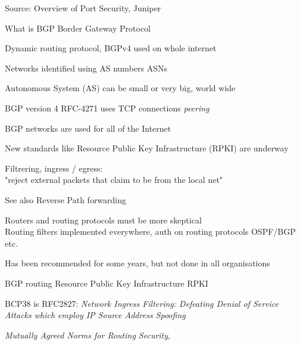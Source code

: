 \documentclass[Screen16to9,17pt]{foils}
\begin{document}
Source: Overview of Port Security, Juniper\\ {\small{}}





\begin{list1}
\item What is BGP Border Gateway Protocol
\item Dynamic routing protocol, BGPv4 used on whole internet
\item Networks identified using AS numbers ASNs
\item Autonomous System (AS) can be small or very big, world wide
\item BGP version 4 RFC-4271 uses TCP connections
\emph{peering}
\item {}
\end{list1}




\begin{list2}
\item BGP networks are used for all of the Internet
\item New standards like Resource Public Key Infrastructure (RPKI) are underway
\end{list2}


\begin{list2}
\item Filtrering, ingress / egress:\\
"reject external packets that claim to be from the local net"
\item See also Reverse Path forwarding 
\item Routers and routing protocols must be more skeptical\\
Routing filters implemented everywhere, auth on routing protocols OSPF/BGP etc.
\item Has been recommended for some years, but not done in all organisations
\item BGP routing Resource Public Key Infrastructure RPKI
\item BCP38 is RFC2827: \emph{Network Ingress Filtering: Defeating Denial of Service Attacks which employ IP Source Address Spoofing}\\
\item \emph{Mutually Agreed Norms for Routing Security}, 
\end{list2}
\end{document}
